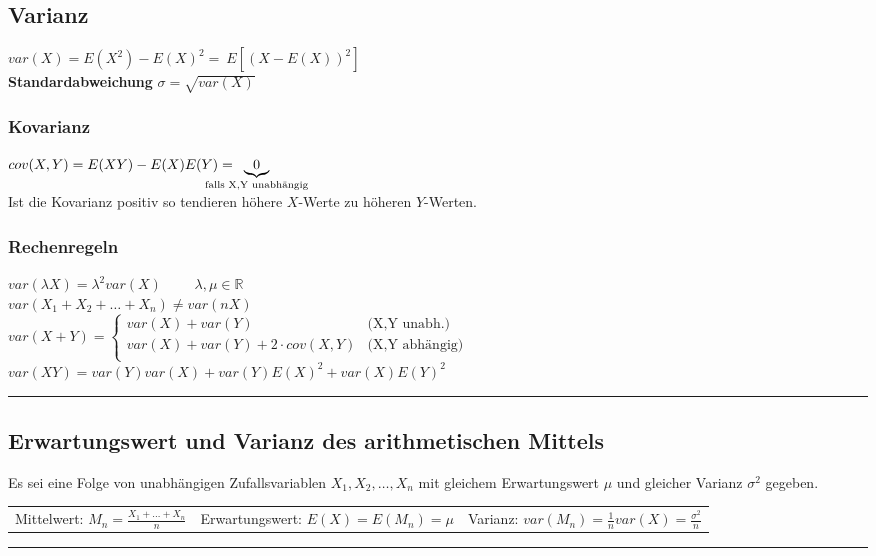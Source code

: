 \begin{minipage}{0.42\textwidth}
	\vspace{2mm}
	\subsection{Varianz}
	$\boxed{var(X)=E(X^2)-E(X)^2}= \:E[(X-E(X))^2]$\\[2pt]
	\textbf{Standardabweichung} $\sigma = \sqrt{var(X)}$

	\subsubsection{Kovarianz}
	$cov(X,Y)=E(XY)-E(X)E(Y)=\hspace{-0.8cm}\underbrace{0}_{\text{falls X,Y unabhängig}}$\\[2pt]
	Ist die Kovarianz positiv so tendieren höhere $X$-Werte zu höheren $Y$-Werten.
	\vspace{.2cm}
\end{minipage}
\hspace{0.02\textwidth}
\begin{minipage}{0.56\textwidth}
	\vspace{2mm}
	\subsubsection{Rechenregeln}
		$var(\lambda X)=\lambda^2 var(X) \qquad $ $\lambda, \mu \in \mathbb{R}$\\[4pt]
		$var(X_1+X_2+\ldots+X_n) \neq var(n X)$ \\[4pt]
		$var(X+Y)= 
			\begin{cases}
		  		var(X)+var(Y) & \text{(X,Y unabh.)}\\                
		  		var(X) + var(Y) + 2 \cdot cov(X,Y) & \text{(X,Y abhängig)}\\
			\end{cases} $ \\[4pt]
		$var(X Y)= var(Y)var(X)+var(Y)E(X)^2+var(X)E(Y)^2$ \\
	\vspace{.2cm}
\end{minipage}

\hrule

\subsection{Erwartungswert und Varianz des arithmetischen Mittels}
Es sei eine Folge von unabhängigen Zufallsvariablen $X_1, X_2, \ldots , X_n$ mit gleichem Erwartungswert $ \mu $ und gleicher Varianz $ \sigma^2 $ gegeben. \\
\begin{tabular}{m{} m{} m{}}
	Mittelwert: $M_n=\frac{X_1+\ldots+X_n}{n}$ &
	Erwartungswert: $E(X)=E(M_n) = \mu$  &
	Varianz: $var(M_n)=\frac{1}{n}var(X) = \frac{\sigma ^2}{n} $
\end{tabular}
\vspace{1mm}
\hrule

